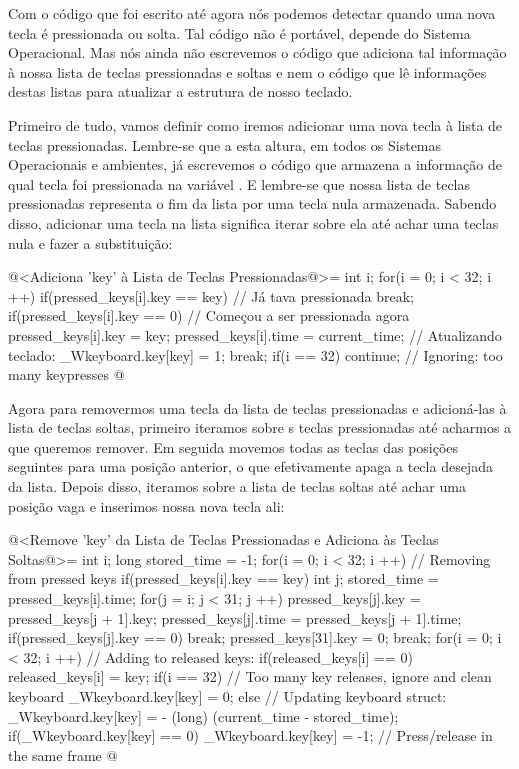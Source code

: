 
Com o código que foi escrito até agora nós podemos detectar quando uma
nova tecla é pressionada ou solta. Tal código não é portável, depende
do Sistema Operacional. Mas nós ainda não escrevemos o código que
adiciona tal informação à nossa lista de teclas pressionadas e soltas
e nem o código que lê informações destas listas para atualizar a
estrutura de nosso teclado.

Primeiro de tudo, vamos definir como iremos adicionar uma nova tecla à
lista de teclas pressionadas. Lembre-se que a esta altura, em todos os
Sistemas Operacionais e ambientes, já escrevemos o código que armazena
a informação de qual tecla foi pressionada na
variável . E lembre-se que nossa lista de teclas
pressionadas representa o fim da lista por uma tecla nula
armazenada. Sabendo disso, adicionar uma tecla na lista significa
iterar sobre ela até achar uma teclas nula e fazer a substituição:

\iniciocodigo
@<Adiciona 'key' à Lista de Teclas Pressionadas@>=
{
  int i;
  for(i = 0; i < 32; i ++){
    if(pressed_keys[i].key == key) // Já tava pressionada
      break;
    if(pressed_keys[i].key == 0){ // Começou a ser pressionada agora
      pressed_keys[i].key = key;
      pressed_keys[i].time = current_time;
      // Atualizando teclado:
      _Wkeyboard.key[key] = 1;
      break;
    }
  }
  if(i == 32) continue; // Ignoring: too many keypresses
}
@
\fimcodigo

Agora para removermos uma tecla da lista de teclas pressionadas e
adicioná-las à lista de teclas soltas, primeiro iteramos sobre s
teclas pressionadas até acharmos a que queremos remover. Em seguida
movemos todas as teclas das posições seguintes para uma posição
anterior, o que efetivamente apaga a tecla desejada da lista. Depois
disso, iteramos sobre a lista de teclas soltas até achar uma posição
vaga e inserimos nossa nova tecla ali:

\iniciocodigo
@<Remove 'key' da Lista de Teclas Pressionadas e Adiciona às Teclas Soltas@>=
{
  int i;
  long stored_time = -1;
  for(i = 0; i < 32; i ++){ // Removing from pressed keys
    if(pressed_keys[i].key == key){
      int j;
      stored_time = pressed_keys[i].time;
      for(j = i; j < 31; j ++){
        pressed_keys[j].key = pressed_keys[j + 1].key;
        pressed_keys[j].time = pressed_keys[j + 1].time;
        if(pressed_keys[j].key == 0)
          break;
      }
      pressed_keys[31].key = 0;
      break;
    }
  }
  for(i = 0; i < 32; i ++){ // Adding to released keys:
    if(released_keys[i] == 0)
      released_keys[i] = key;
  }
  if(i == 32) // Too many key releases, ignore and clean keyboard
    _Wkeyboard.key[key] = 0;
  else{
    // Updating keyboard struct:
    _Wkeyboard.key[key] = - (long) (current_time - stored_time);
    if(_Wkeyboard.key[key] == 0)
      _Wkeyboard.key[key] = -1; // Press/release in the same frame
  }
}
@
\fimcodigo

